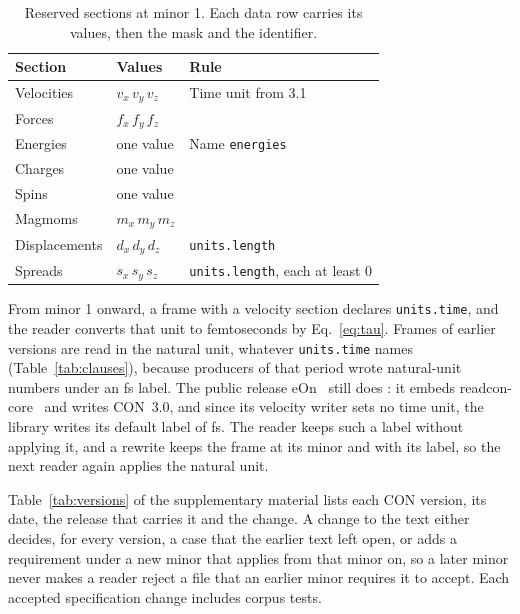 \documentclass[preprint,12pt]{elsarticle}
\begin{document}
\begin{table}[tbp] \centering \small \caption{Reserved sections at minor 1.
Each data row carries its values, then the mask and the identifier.}
\label{tab:sections}
\begin{tabular}{lll}
\toprule
Section & Values & Rule \\
\midrule
Velocities & \(v_x\, v_y\, v_z\) & Time unit from 3.1 \\
Forces & \(f_x\, f_y\, f_z\) & \\
Energies & one value & Name \texttt{energies} \\
Charges & one value & \\
Spins & one value & \\
Magmoms & \(m_x\, m_y\, m_z\) & \\
Displacements & \(d_x\, d_y\, d_z\) & \texttt{units.length} \\
Spreads & \(s_x\, s_y\, s_z\) & \texttt{units.length}, each at least 0 \\
\bottomrule
\end{tabular}
\end{table}

From minor 1 onward, a frame with a velocity section declares \texttt{units.time}, and the reader converts that unit to femtoseconds by Eq.~\eqref{eq:tau}.
Frames of earlier versions are read in the natural unit, whatever \texttt{units.time} names (Table~\ref*{tab:clauses}), because producers of that period wrote natural-unit numbers under an fs label.
The public release eOn~\eOneEonVersion{} still does \cite{rohitgoswamiTheochemuieonV3602026}: it embeds readcon-core~\eOneEonReadcon{} and writes CON~3.0, and since its velocity writer sets no time unit, the library writes its default label of fs.
The reader keeps such a label without applying it, and a rewrite keeps the frame at its minor and with its label, so the next reader again applies the natural unit.

Table~\ref*{tab:versions} of the supplementary material lists each CON version, its date, the release that carries it and the change.
A change to the text either decides, for every version, a case that the earlier text left open, or adds a requirement under a new minor that applies from that minor on, so a later minor never makes a reader reject a file that an earlier minor requires it to accept.
Each accepted specification change includes corpus tests.
\end{document}
